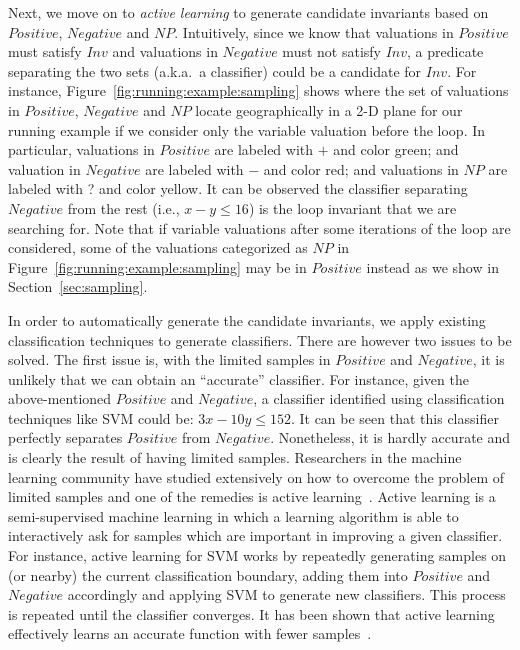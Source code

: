 Next, we move on to \emph{active learning} to generate candidate invariants based on $\mathit{Positive}$, $\mathit{Negative}$ and $\mathit{NP}$. Intuitively, since we know that valuations in $\mathit{Positive}$ must satisfy $\mathit{Inv}$ and valuations in $\mathit{Negative}$ must not satisfy $\mathit{Inv}$, a predicate separating the two sets (a.k.a.~a classifier) could be a candidate for $\mathit{Inv}$.
For instance, Figure~\ref{fig:running:example:sampling} shows where the set of valuations in $\mathit{Positive}$, $\mathit{Negative}$ and $\mathit{NP}$ locate geographically in a 2-D plane for our running example if we consider only the variable valuation before the loop. 
In particular, valuations in $\mathit{Positive}$ are labeled with $+$ and color green; 
and valuation in $\mathit{Negative}$ are labeled with $-$ and color red; 
and valuations in $\mathit{NP}$ are labeled with ? and color yellow. 
It can be observed the classifier separating $\mathit{Negative}$ from the rest (i.e., $x - y \leq 16$) is the loop invariant that we are searching for. 
Note that if variable valuations after some iterations of the loop are considered, some of the valuations categorized as $NP$ in Figure~\ref{fig:running:example:sampling} may be in $Positive$ instead as we show in Section~\ref{sec:sampling}.

In order to automatically generate the candidate invariants, we apply existing classification techniques to generate classifiers. 
There are however two issues to be solved. The first issue is, with the limited samples in $\mathit{Positive}$ and $\mathit{Negative}$, 
it is unlikely that we can obtain an ``accurate'' classifier. 
For instance, given the above-mentioned $\mathit{Positive}$ and $\mathit{Negative}$, a classifier identified using classification techniques like SVM could be: $3x-10y \leq 152$. %
It can be seen that this classifier perfectly separates $\mathit{Positive}$ from $\mathit{Negative}$. 
Nonetheless, it is hardly accurate and is clearly the result of having limited samples. 
Researchers in the machine learning community have studied extensively on how to overcome the problem of limited samples and one of the remedies is active learning~\cite{DBLP:series/synthesis/2012Settles}. 
Active learning is a semi-supervised machine learning in which a learning algorithm is able to interactively ask for samples which are important in improving a given classifier. 
For instance, active learning for SVM works by repeatedly generating samples on (or nearby) the current classification boundary, adding them into $\mathit{Positive}$ and $\mathit{Negative}$ accordingly and applying SVM to generate new classifiers. 
This process is repeated until the classifier converges. It has been shown that active learning effectively learns an accurate function with fewer samples~\cite{DBLP:conf/icml/SchohnC00}.


